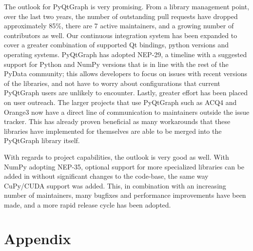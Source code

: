 \documentclass[journal]{vgtc}                %
\begin{document}
The outlook for PyQtGraph is very promising.  From a library management point, over the last two years, the number of outstanding pull requests have dropped approximately 85\%, there are 7 active maintainers, and a growing number of contributors as well.  Our continuous integration system has been expanded to cover a greater combination of supported Qt bindings, python versions and operating systems.  PyQtGraph has adopted NEP-29, a timeline with a suggested support for Python and NumPy versions that is in line with the rest of the PyData community; this allows developers to focus on issues with recent versions of the libraries, and not have to worry about configurations that current PyQtGraph users are unlikely to encounter.  Lastly, greater effort has been placed on user outreach.  The larger projects that use PyQtGraph such as ACQ4 and Orange3 now have a direct line of communication to maintainers outside the issue tracker.  This has already proven beneficial as many workarounds that these libraries have implemented for themselves are able to be merged into the PyQtGraph library itself.

With regards to project capabilities, the outlook is very good as well.  With NumPy adopting NEP-35, optional support for more specialized libraries can be added in without significant changes to the code-base, the same way CuPy/CUDA support was added.  This, in combination with an increasing number of maintainers, many bugfixes and performance improvements have been made, and a more rapid release cycle has been adopted.



%

%
%
%

\section{Appendix}
\end{document}
